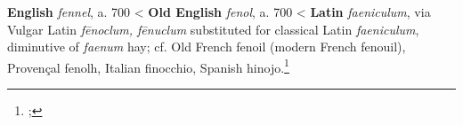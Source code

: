 \begin{etymology}\label{ety:fennel}
\textbf{English} \textit{fennel}, a. 700
< \textbf{Old English} \textit{fenol}, a. 700
< \textbf{Latin} \textit{faeniculum}, via Vulgar Latin \textit{fēnoclum, fēnuclum} substituted for classical Latin \textit{faeniculum}, diminutive of \textit{faenum} hay; cf. Old French fenoil (modern French fenouil), Provençal fenolh, Italian finocchio, Spanish hinojo.\footnote{\textcite[s.v. fennel]{oed}; }
\end{etymology}